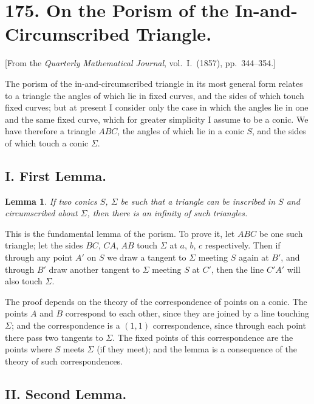 \documentclass[11pt,a4paper]{article}
\theoremstyle{plain}
\newtheorem{lemma}{Lemma}
\begin{document}
\newpage
\section*{175. On the Porism of the In-and-Circumscribed Triangle.}

[From the \textit{Quarterly Mathematical Journal}, vol.~I.~(1857), pp.~344--354.]

The porism of the in-and-circumscribed triangle in its most general form relates to a triangle the angles of which lie in fixed curves, and the sides of which touch fixed curves; but at present I consider only the case in which the angles lie in one and the same fixed curve, which for greater simplicity I assume to be a conic. We have therefore a triangle $ABC$, the angles of which lie in a conic $S$, and the sides of which touch a conic $\Sigma$.

\subsection*{I. First Lemma.}

\begin{lemma}
If two conics $S$, $\Sigma$ be such that a triangle can be inscribed in $S$ and circumscribed about $\Sigma$, then there is an infinity of such triangles.
\end{lemma}

This is the fundamental lemma of the porism. To prove it, let $ABC$ be one such triangle; let the sides $BC$, $CA$, $AB$ touch $\Sigma$ at $a$, $b$, $c$ respectively. Then if through any point $A'$ on $S$ we draw a tangent to $\Sigma$ meeting $S$ again at $B'$, and through $B'$ draw another tangent to $\Sigma$ meeting $S$ at $C'$, then the line $C'A'$ will also touch $\Sigma$.

The proof depends on the theory of the correspondence of points on a conic. The points $A$ and $B$ correspond to each other, since they are joined by a line touching $\Sigma$; and the correspondence is a $(1,1)$ correspondence, since through each point there pass two tangents to $\Sigma$. The fixed points of this correspondence are the points where $S$ meets $\Sigma$ (if they meet); and the lemma is a consequence of the theory of such correspondences.

\subsection*{II. Second Lemma.}
\end{document}
